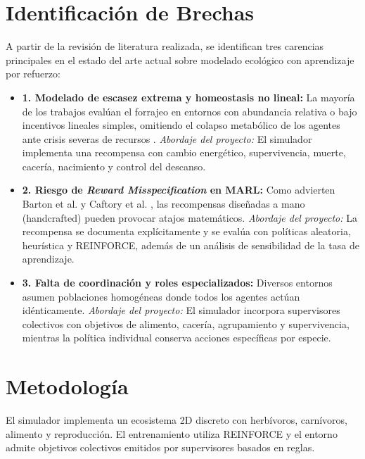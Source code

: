 \documentclass[conference]{IEEEtran}
\begin{document}
\section{Identificación de Brechas}
A partir de la revisión de literatura realizada, se identifican tres carencias principales en el estado del arte actual sobre modelado ecológico con aprendizaje por refuerzo:

\begin{itemize}
    \item \textbf{1. Modelado de escasez extrema y homeostasis no lineal:} La mayoría de los 
    trabajos eval\'uan el forrajeo en entornos con abundancia relativa o bajo incentivos 
    lineales simples, omitiendo el colapso metabólico de los agentes ante crisis severas 
    de recursos \cite{Paper2, Paper14}. \textit{Abordaje del proyecto:} El simulador 
    implementa una recompensa con cambio energético, supervivencia, muerte, cacería, 
    nacimiento y control del descanso.
    \item \textbf{2. Riesgo de \textit{Reward Misspecification} en MARL:} Como advierten 
    Barton et al. \cite{Paper15} y Caftory et al. \cite{Paper11}, las recompensas diseñadas 
    a mano (handcrafted) pueden provocar atajos matemáticos. \textit{Abordaje del proyecto:} 
    La recompensa se documenta explícitamente y se evalúa con políticas aleatoria, heurística y 
    REINFORCE, además de un análisis de sensibilidad de la tasa de aprendizaje.
    \item \textbf{3. Falta de coordinación y roles especializados:} Diversos entornos asumen 
    poblaciones homogéneas donde todos los agentes act\'uan idénticamente. 
    \textit{Abordaje del proyecto:} El simulador incorpora supervisores colectivos con 
    objetivos de alimento, cacería, agrupamiento y supervivencia, mientras la política 
    individual conserva acciones específicas por especie.
\end{itemize}

\section{Metodología}

El simulador implementa un ecosistema 2D discreto con herbívoros,
carnívoros, alimento y reproducción. El entrenamiento utiliza REINFORCE y el
entorno admite objetivos colectivos emitidos por supervisores basados en reglas.
\end{document}

